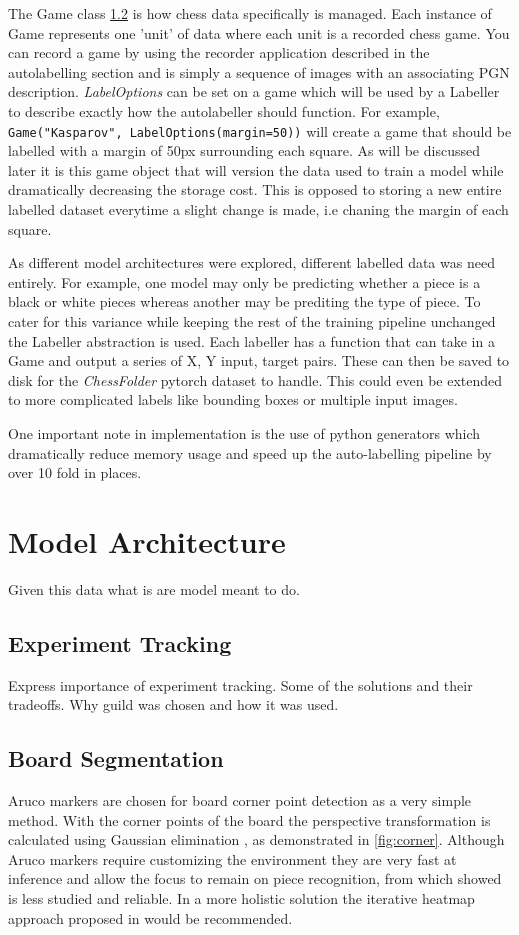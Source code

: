 The Game class \ref{} is how chess data specifically is managed.  Each instance of Game represents one 'unit' of data where each unit is a recorded chess game.
You can record a game by using the recorder application described in the autolabelling section and is simply a sequence of images with
an associating PGN description. \textit{LabelOptions} can be set on a game which will be used by a Labeller to describe exactly how the autolabeller 
should function.  For example, \verb|Game("Kasparov", LabelOptions(margin=50))| will create a game that should be labelled
with a margin of 50px surrounding each square.  As will be discussed later it is this game object that will version the data used to train a model while dramatically
decreasing the storage cost.  This is opposed to storing a new entire labelled dataset everytime a slight change is made, i.e chaning the margin of each square.

As different model architectures were explored, different labelled data was need entirely.  For example, one model may only be 
predicting whether a piece is a black or white pieces whereas another may be prediting the type of piece.  To cater for this variance while keeping the rest of the 
training pipeline unchanged the Labeller abstraction is used.  Each labeller has a function that can take in a Game and output a series of X, Y input, target pairs.
These can then be saved to disk for the \textit{ChessFolder} pytorch dataset to handle. 
This could even be extended to more complicated labels like bounding boxes or multiple input images.

One important note in implementation is the use of python generators which dramatically reduce memory usage and speed up the auto-labelling pipeline by over 10 fold in 
places.

\section{Model Architecture}
Given this data what is are model meant to do.

\subsection{Experiment Tracking}
Express importance of experiment tracking.  Some of the solutions \cite{} and their tradeoffs.
Why guild was chosen and how it was used.

\subsection{Board Segmentation}
Aruco markers are chosen for board corner point detection as a very simple method.
With the corner points of the board the perspective transformation is calculated using
Gaussian elimination \cite{gauss}, as demonstrated in \autoref{fig:corner}.
Although Aruco markers require customizing the environment they are very fast at 
inference and allow the focus to remain on piece recognition, from which
 showed is less studied and reliable.  In a more holistic solution the 
iterative heatmap approach proposed in \cite{heatmap} would be recommended.

